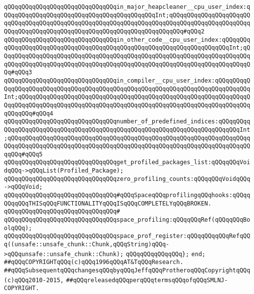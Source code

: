 \verb|qQQqqQQqqQQqqQQqqQQqqQQqqQQqqQQqin_major_heapcleaner__cpu_user_index:qQQqqQQqqQQqqQQqqQQqqQQqqQQqqQQqqQQqqQQqqQQqInt;qQQqqQQqqQQqqQQqqQQqqQQqqQQqqQQqqQQqqQQqqQQqqQQqqQQqqQQqqQQqqQQqqQQqqQQqqQQqqQQqqQQqqQQqqQQqqQQqqQQqqQQqqQQqqQQqqQQqqQQqqQQqqQQqqQQqqQQqqQQqqQQq#qQQq2|\newline
\verb|qQQqqQQqqQQqqQQqqQQqqQQqqQQqqQQqin_other_code__cpu_user_index:qQQqqQQqqQQqqQQqqQQqqQQqqQQqqQQqqQQqqQQqqQQqqQQqqQQqqQQqqQQqqQQqqQQqqQQqInt;qQQqqQQqqQQqqQQqqQQqqQQqqQQqqQQqqQQqqQQqqQQqqQQqqQQqqQQqqQQqqQQqqQQqqQQqqQQqqQQqqQQqqQQqqQQqqQQqqQQqqQQqqQQqqQQqqQQqqQQqqQQqqQQqqQQqqQQqqQQqqQQq#qQQq3|\newline
\verb|qQQqqQQqqQQqqQQqqQQqqQQqqQQqqQQqin_compiler__cpu_user_index:qQQqqQQqqQQqqQQqqQQqqQQqqQQqqQQqqQQqqQQqqQQqqQQqqQQqqQQqqQQqqQQqqQQqqQQqqQQqqQQqInt;qQQqqQQqqQQqqQQqqQQqqQQqqQQqqQQqqQQqqQQqqQQqqQQqqQQqqQQqqQQqqQQqqQQqqQQqqQQqqQQqqQQqqQQqqQQqqQQqqQQqqQQqqQQqqQQqqQQqqQQqqQQqqQQqqQQqqQQqqQQqqQQq#qQQq4|\newline
\verb|qQQqqQQqqQQqqQQqqQQqqQQqqQQqqQQqnumber_of_predefined_indices:qQQqqQQqqQQqqQQqqQQqqQQqqQQqqQQqqQQqqQQqqQQqqQQqqQQqqQQqqQQqqQQqqQQqqQQqqQQqInt;qQQqqQQqqQQqqQQqqQQqqQQqqQQqqQQqqQQqqQQqqQQqqQQqqQQqqQQqqQQqqQQqqQQqqQQqqQQqqQQqqQQqqQQqqQQqqQQqqQQqqQQqqQQqqQQqqQQqqQQqqQQqqQQqqQQqqQQqqQQqqQQq#qQQq5|\newline
\newline
\verb|qQQqqQQqqQQqqQQqqQQqqQQqqQQqqQQqget_profiled_packages_list:qQQqqQQqVoidqQQq->qQQqList(Profiled_Package);|\newline
\newline
\verb|qQQqqQQqqQQqqQQqqQQqqQQqqQQqqQQqzero_profiling_counts:qQQqqQQqVoidqQQq->qQQqVoid;|\newline
\newline
\verb|qQQqqQQqqQQqqQQqqQQqqQQqqQQqqQQq#qQQqSpaceqQQqprofilingqQQqhooks:qQQqqQQqqQQqTHISqQQqFUNCTIONALITYqQQqISqQQqCOMPLETELYqQQqBROKEN.|\newline
\verb|qQQqqQQqqQQqqQQqqQQqqQQqqQQqqQQq#|\newline
\verb|qQQqqQQqqQQqqQQqqQQqqQQqqQQqqQQqspace_profiling:qQQqqQQqRef(qQQqqQQqBoolqQQq);|\newline
\verb|qQQqqQQqqQQqqQQqqQQqqQQqqQQqqQQqspace_prof_register:qQQqqQQqqQQqRefqQQq((unsafe::unsafe_chunk::Chunk,qQQqString)qQQq->qQQqunsafe::unsafe_chunk::Chunk);|\newline
\newline
\verb|qQQqqQQqqQQqqQQq};|\newline
\verb|end;|\newline
\newline
\newline
\verb|##qQQqCOPYRIGHTqQQq(c)qQQq1996qQQqAT&TqQQqResearch.|\newline
\verb|##qQQqSubsequentqQQqchangesqQQqbyqQQqJeffqQQqProtheroqQQqCopyrightqQQq(c)qQQq2010-2015,|\newline
\verb|##qQQqreleasedqQQqperqQQqtermsqQQqofqQQqSMLNJ-COPYRIGHT.|\newline

